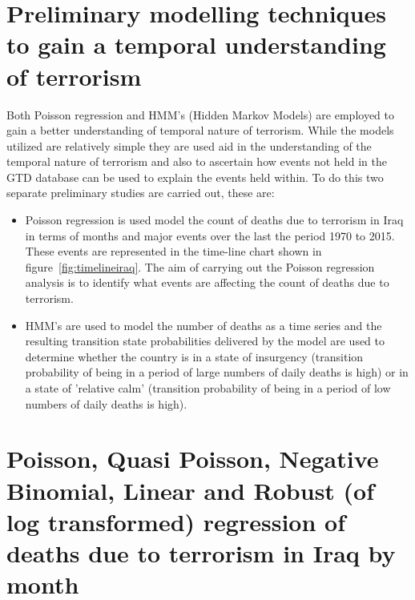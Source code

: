 \section{Preliminary modelling techniques to gain a temporal understanding of terrorism}
Both Poisson regression and HMM's (Hidden Markov Models) are employed to gain a better understanding of temporal nature of terrorism. While the models utilized are relatively simple they are used aid in the understanding of the temporal nature of terrorism and also to ascertain how events not held in the GTD database can be used to explain the events held within. To do this two separate preliminary studies are carried out, these are:
\begin{itemize}
\item Poisson regression is used model the count of deaths due to terrorism in Iraq in terms of months and major events over the last the period 1970 to 2015. These events are  represented in the time-line chart shown in figure~\ref{fig:timelineiraq}. The aim of carrying out the Poisson regression analysis is to identify what events are affecting the count of deaths due to terrorism. 
\item HMM's are used to model the number of deaths as a time series and the resulting transition state probabilities delivered by the model are used to determine whether the country is in a state of insurgency (transition probability of being in a period of large numbers of daily deaths is high) or in a state of 'relative calm'  (transition probability of being in a period of low numbers of daily deaths is high).
\end{itemize}

\section{Poisson, Quasi Poisson, Negative Binomial, Linear  and Robust (of log transformed)  regression of deaths due to terrorism in Iraq by month}

